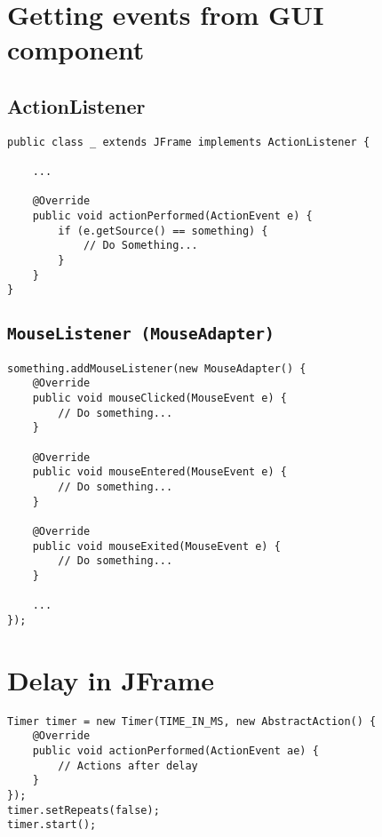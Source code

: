 \section{Getting events from GUI component}
\subsection{ActionListener}
\begin{verbatim}
public class _ extends JFrame implements ActionListener {
    
    ...

    @Override
    public void actionPerformed(ActionEvent e) {
        if (e.getSource() == something) {
            // Do Something...
        }
    }
}
\end{verbatim}

\subsection{\texttt{MouseListener (MouseAdapter)}}
\begin{verbatim}
something.addMouseListener(new MouseAdapter() {
    @Override
    public void mouseClicked(MouseEvent e) {
        // Do something...
    }

    @Override
    public void mouseEntered(MouseEvent e) {
        // Do something...
    }

    @Override
    public void mouseExited(MouseEvent e) {
        // Do something...
    }

    ...
});
\end{verbatim}

\section{Delay in JFrame}
\begin{verbatim}
Timer timer = new Timer(TIME_IN_MS, new AbstractAction() {
    @Override
    public void actionPerformed(ActionEvent ae) {
        // Actions after delay
    }
});
timer.setRepeats(false);
timer.start();
\end{verbatim}


